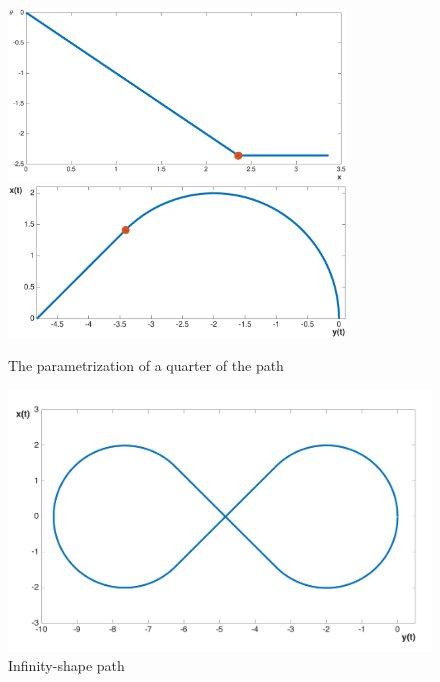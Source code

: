\begin{figure}[!htbp]
  \centering
 {\includegraphics[width=0.8\textwidth]{img/angle_x.eps}\label{fig:quarter_theta}}
  \hfill
  {\includegraphics[width=0.8\textwidth]{img/path_x_quarter.eps}\label{fig:quarter_xy}}
  \caption{The parametrization of a quarter of the path}
  \label{fig:quarter_path}
\end{figure}

\begin{figure}[!htbp]
    \centering
    \includegraphics[width=1\textwidth]{img/infinityshapepath.png}
    \caption{Infinity-shape path}
    \label{fig:entire_path}
\end{figure}


